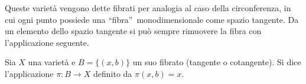 Queste varietà vengono dette fibrati per analogia al caso della circonferenza, in cui ogni punto possiede una \textquotedblleft fibra\textquotedblright\ monodimensionale come spazio tangente. Da un elemento dello spazio tangente si può sempre rimuovere la fibra con l'applicazione seguente.
\begin{definition}
  Sia $X$ una varietà e $B=\{(x,b)\}$ un suo fibrato (tangente o cotangente). Si dice  l'applicazione $\pi: B \to X$ definito da $\pi(x,b) = x$.
\end{definition}